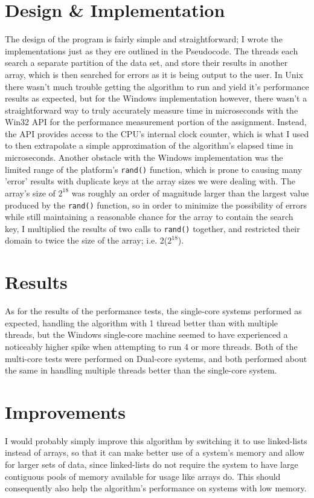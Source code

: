 \documentclass[12pt]{article}
\begin{document}
\section*{Design \& Implementation}
The design of the program is fairly simple and straightforward; I wrote the implementations just as they ere outlined in the Pseudocode.
The threads each search a separate partition of the data set, and store their results in another array, which is then searched for
errors as it is being output to the user. In Unix there wasn't much trouble getting the algorithm to run and yield it's performance 
results as expected, but for the Windows implementation however, there wasn't a straightforward way to truly accurately measure time in 
microseconds with the Win32 API for the performance measurement portion of the assignment. Instead, the API provides access to the CPU's 
internal clock counter, which is what I used to then extrapolate a simple approximation of the algorithm's elapsed time in microseconds.  
Another obstacle with the Windows implementation was the limited range of the platform's \texttt{rand()} function, which is prone to causing 
many 'error' results with duplicate keys at the array sizes we were dealing with. The array's size of $2^{18}$ was roughly an order of magnitude 
larger than the largest value produced by the \texttt{rand()} function, so in order to minimize the possibility of errors while still maintaining 
a reasonable chance for the array to contain the search key, I multiplied the results of two calls to \texttt{rand()} together, and restricted 
their domain to twice the size of the array; i.e. 2($2^{18}$).


\section*{Results}
As for the results of the performance tests, the single-core systems performed as expected, handling the algorithm with 1 thread better than with multiple threads, but the Windows single-core machine seemed to have experienced a noticeably higher spike when attempting to run 4 or more threads. Both of the multi-core tests were performed on Dual-core systems, and both performed about the same in handling multiple threads better than the single-core system.


\section*{Improvements}
I would probably simply improve this algorithm by switching it to use linked-lists instead of arrays, so that it can make better use of a system's memory and allow for larger sets of data,
since linked-lists do not require the system to have large contiguous pools of memory available for usage like arrays do. This should consequently also help the algorithm's performance
on systems with low memory.
\end{document}
